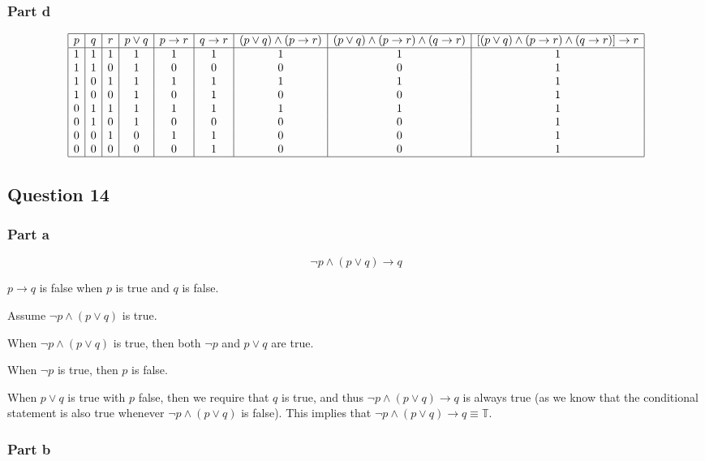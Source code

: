 \documentclass[12pt]{article}
\begin{document}
\subsubsection*{Part d}

\[
\begin{array}{|c|c|c|c|c|c|c|c|c|}
\hline
p & q & r & p \lor q & p \to r & q \to r & (p \lor q) \land (p \to r) & (p \lor q) \land (p \to r) \land (q \to r) & [(p \lor q) \land (p \to r) \land (q \to r)] \to r \\
\hline
1 & 1 & 1 & 1 & 1 & 1 & 1 & 1 & 1 \\
1 & 1 & 0 & 1 & 0 & 0 & 0 & 0 & 1 \\
1 & 0 & 1 & 1 & 1 & 1 & 1 & 1 & 1 \\
1 & 0 & 0 & 1 & 0 & 1 & 0 & 0 & 1 \\
0 & 1 & 1 & 1 & 1 & 1 & 1 & 1 & 1 \\
0 & 1 & 0 & 1 & 0 & 0 & 0 & 0 & 1 \\
0 & 0 & 1 & 0 & 1 & 1 & 0 & 0 & 1 \\
0 & 0 & 0 & 0 & 0 & 1 & 0 & 0 & 1 \\
\hline
\end{array}
\]

\subsection*{Question 14}

\subsubsection*{Part a}

\[
\neg p \land (p \lor q) \to q
\]

$p \to q$ is false when $p$ is true and $q$ is false.

Assume $ \neg p \land (p \lor q)$ is true.

When $ \neg p \land (p \lor q)$ is true, then both $ \neg p$ and $ p \lor q$ are true.

When $ \neg p$ is true, then $ p$ is false.

When $ p \lor q$ is true with $ p$ false, then we require that $ q$
is true, and thus $ \neg p \land (p \lor q) \to q$ is always true
(as we know that the conditional statement is also true whenever
$ \neg p \land (p \lor q)$ is false). This implies that
$ \neg p \land (p \lor q) \to q \equiv \mathbb{T}$.

\subsubsection*{Part b}
\end{document}
